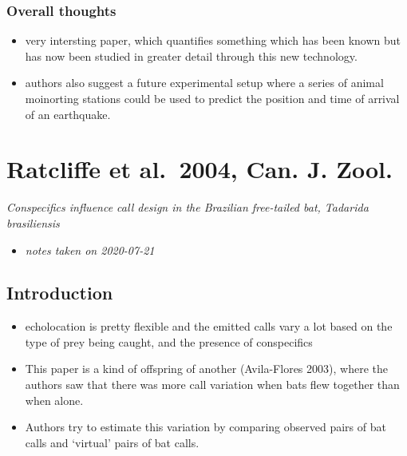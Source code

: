 \documentclass[
]{book}
\providecommand{\tightlist}{%
  \setlength{\itemsep}{0pt}\setlength{\parskip}{0pt}}
\begin{document}
\hypertarget{overall-thoughts}{%
\subsection{Overall thoughts}\label{overall-thoughts}}

\begin{itemize}
\item
  very intersting paper, which quantifies something which has been known but has now been studied in greater detail through this new technology.
\item
  authors also suggest a future experimental setup where a series of animal moinorting stations could be used to predict the position and time of arrival of an earthquake.
\end{itemize}

\hypertarget{ratcliffe-et-al.-2004-can.-j.-zool.}{%
\chapter{Ratcliffe et al.~2004, Can. J. Zool.}\label{ratcliffe-et-al.-2004-can.-j.-zool.}}


\emph{Conspecifics influence call design in the Brazilian free-tailed bat, Tadarida brasiliensis} \citep{ratcliffe2004conspecifics}

\begin{itemize}
\tightlist
\item
  \emph{notes taken on 2020-07-21}
\end{itemize}

\hypertarget{introduction-1}{%
\section{Introduction}\label{introduction-1}}

\begin{itemize}
\tightlist
\item
  echolocation is pretty flexible and the emitted calls vary a lot based on the type of prey being caught, and the presence of conspecifics
\item
  This paper is a kind of offspring of another (Avila-Flores 2003), where the authors saw that there was more call variation when bats flew together than when alone.
\item
  Authors try to estimate this variation by comparing observed pairs of bat calls and `virtual' pairs of bat calls.
\end{itemize}
\end{document}

